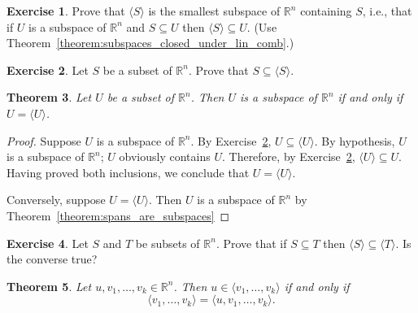 \documentclass[fullpage]{amsart}
\newcommand{\RR}{\mathbb{R}}
\newtheorem{theorem}{Theorem}[section]
\theoremstyle{definition}
\newtheorem{exercise}[theorem]{Exercise}
\begin{document}
\begin{exercise}\label{exercise:span_is_smallest}
  Prove that $\langle S\rangle$ is the smallest subspace of $\RR^n$ containing $S$, i.e., that
  if $U$ is a subspace of $\RR^n$ and $S\subseteq U$ then $\langle S\rangle\subseteq U$.
  (Use Theorem~\ref{theorem:subspaces_closed_under_lin_comb}.)
\end{exercise}

\begin{exercise}\label{exercise:spanners_in_span}
Let $S$ be a subset of $\RR^n$. Prove that $S\subseteq\langle S\rangle$.
\end{exercise}

\begin{theorem}\label{theorem:subspace_means_own_span}
  Let $U$ be a subset of $\RR^n$.
  Then $U$ is a subspace of $\RR^n$ if and only if $U=\langle U\rangle$.
\end{theorem}
\begin{proof}
  Suppose $U$ is a subspace of $\RR^n$.
  By Exercise~\ref{exercise:spanners_in_span}, $U\subseteq\langle U\rangle$.
  By hypothesis, $U$ is a subspace of $\RR^n$; $U$ obviously contains $U$.
  Therefore, by Exercise~\ref{exercise:spanners_in_span}, $\langle U\rangle\subseteq U$.
  Having proved both inclusions, we conclude that $U=\langle U\rangle$.

  Conversely, suppose $U=\langle U\rangle$.
  Then $U$ is a subspace of $\RR^n$ by Theorem~\ref{theorem:spans_are_subspaces}
\end{proof}

\begin{exercise}\label{exercise:span_monotonicity}
  Let $S$ and $T$ be subsets of $\RR^n$. Prove that if $S\subseteq T$ then $\langle S\rangle\subseteq\langle T\rangle$. Is the converse true?
\end{exercise}
\begin{theorem}
  Let $u,v_1,\ldots,v_k\in\RR^n$. Then $u\in \langle v_1,\ldots,v_k\rangle$ if and only if
\begin{equation}\label{equation:span_monotonicity_1}
  \langle v_1,\ldots,v_k\rangle = \langle u, v_1,\ldots,v_k\rangle.
\end{equation}
\end{theorem}
\end{document}
